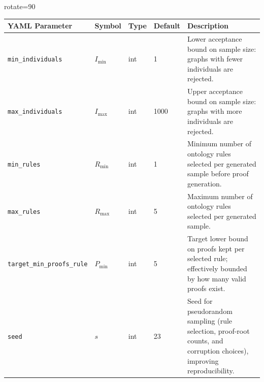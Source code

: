\documentclass{IOS-Book-Article}     %
\begin{document}
\begin{table}[h!]
	\centering
	\begin{adjustbox}{rotate=90}
		\begin{tabular}{|l|l|l|l|p{9.76cm}|}
			\hline
			\textbf{YAML Parameter}            & \textbf{Symbol}      & \textbf{Type} & \textbf{Default} & \textbf{Description}                                                                                                                                                             \\
			\hline \hline
			\texttt{min\_individuals}          & $I_{\min}$           & int           & 1                & Lower acceptance bound on sample size: graphs with fewer individuals are rejected.                                                                                               \\
			\hline
			\texttt{max\_individuals}          & $I_{\max}$           & int           & 1000             & Upper acceptance bound on sample size: graphs with more individuals are rejected.                                                                                                \\
			\hline
			\texttt{min\_rules}                & $R_{\min}$           & int           & 1                & Minimum number of ontology rules selected per generated sample before proof generation.                                                                                          \\
			\hline
			\texttt{max\_rules}                & $R_{\max}$           & int           & 5                & Maximum number of ontology rules selected per generated sample.                                                                                                                  \\
			\hline
			\texttt{target\_min\_proofs\_rule} & $P_{\min}$           & int           & 5                & Target lower bound on proofs kept per selected rule; effectively bounded by how many valid proofs exist.                                                                         \\
			\hline
			\texttt{seed}                      & $s$                  & int           & 23               & Seed for pseudorandom sampling (rule selection, proof-root counts, and corruption choices), improving reproducibility.                                                           \\
			\hline


\end{tabular}
\end{adjustbox}
\end{table}
\end{document}

